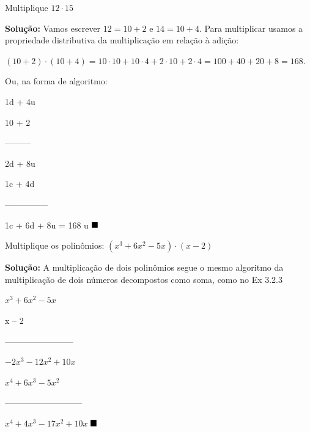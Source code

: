 \begin{texemplo}
Multiplique $12 \cdot 15$

\textbf{Solução: }
Vamos escrever $12 = 10 + 2$ e $14 = 10 + 4$. Para multiplicar usamos a propriedade distributiva da multiplicação em relação à adição:

$(10 + 2) \cdot  (10 + 4) = 10 \cdot 10 + 10 \cdot 4 + 2 \cdot 10 + 2 \cdot 4 = 100 + 40 + 20 + 8 = 168$.

Ou, na forma de algoritmo:

\hspace{7mm} 1d + 4u

\hspace{7mm} 10 + 2

\hspace{7mm} ---------

\hspace{7mm} 2d    + 8u

\hspace{-1mm} 1c  + 4d

            ---------------

            1c + 6d + 8u        = 168 u $\qedsymbol$

\end{texemplo}

\begin{texemplo}
Multiplique os polinômios: $(x^3 + 6x^2 - 5x) \cdot (x - 2)$

\textbf{Solução:}
A multiplicação de dois polinômios segue o mesmo algoritmo da multiplicação de dois números decompostos como soma, como no Ex 3.2.3

\hspace{8mm}$x^3 + 6x^2 - 5x$
                
\hspace{23mm}x – 2
		      			 
\hspace{4mm}------------------------
				
\hspace{4mm} $-2x^3 -12x^2  + 10x$
       		       	          
$x^4 +6x^3 -5x^2 $ 
		                
---------------------------

$x^4  +  4x^3  -17x^2  + 10x$ $\qedsymbol$
\end{texemplo}

